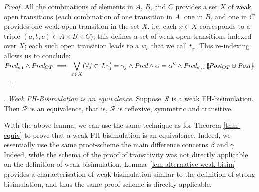 \documentclass{lmcs}
\begin{document}
\begin{proof}
All the combinations of elements in $A$, $B$, and $C$ provides a set $X$ of weak open transitions (each combination of one transition in $A$, one in $B$, and one in $C$ provides one weak open transition in the set $X$, i.e. each $x\in X$ corresponds to a triple $(a,b,c)\in A\times B\times C$); this defines a set of weak open transitions indexed over $X$;  each such open transition leads to a $w_c$ that we call $t_x$. This re-indexing allows us to conclude:\\
$\Pred_{s,t} \land \Pred_{OT}\implies
 \displaystyle{\bigvee_{x\in X}} 
(\forall j\in J.\gamma_j'=\gamma_j \land  \Pred \land \alpha=\alpha''  \land \Pred_{s',x}\subst{\Post_{OT}\uplus\Post\,}$\\
\end{proof}



{}. \emph{Weak FH-Bisimulation is an equivalence}.
 Suppose $\mathcal{R}$ 
is a weak FH-bisimulation. Then $\mathcal{R}$ is an equivalence, that is, $\mathcal{R}$ is 
reflexive, symmetric and transitive.

With the above lemma, we can use the same technique as for Theorem \ref{thm-equiv}  to prove that a weak FH-bisimulation is an equivalence. Indeed, we essentially use the same proof-scheme the main difference concerns  $\beta$ and  $\gamma$. Indeed, while the schema of the proof of transitivity was not directly applicable on the definition of weak bisimulation,  Lemma~\ref{lem-alternative-weak-bisim} provides a characterisation of weak bisimulation similar to the definition of strong bisimulation, and thus the same proof scheme is directly applicable.

 

       		



       		
\end{document}
